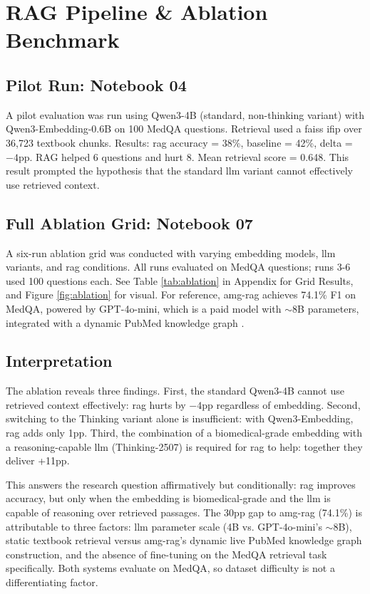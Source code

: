 \chapter{RAG Pipeline \& Ablation Benchmark}
\label{ch:ablation}

\section{Pilot Run: Notebook 04}

A pilot evaluation was run using Qwen3-4B (standard, non-thinking variant) with Qwen3-Embedding-0.6B on 100 MedQA questions. Retrieval used a \gls{faiss} \gls{ifip} \cite{johnson2019} over 36,723 textbook chunks. Results: \gls{rag} accuracy = 38\%, baseline = 42\%, delta = $-4$\gls{pp}. RAG helped 6 questions and hurt 8. Mean retrieval score = 0.648. This result prompted the hypothesis that the standard \gls{llm} variant cannot effectively use retrieved context. 

\section{Full Ablation Grid: Notebook 07}
A six-run ablation grid was conducted with varying embedding models, \gls{llm} variants, and \gls{rag} conditions. All runs evaluated on MedQA questions; runs 3-6 used 100 questions each. See Table \ref{tab:ablation} in Appendix for Grid Results, and Figure \ref{fig:ablation} for visual. For reference, \gls{amg-rag} achieves 74.1\% F1 on MedQA, powered by GPT-4o-mini, which is a paid model with $\sim$8B parameters, integrated with a dynamic PubMed knowledge graph \cite{rezaei2025}. 

\section{Interpretation}

The ablation reveals three findings. First, the standard Qwen3-4B cannot use retrieved context effectively: \gls{rag} hurts by $-4$\gls{pp} regardless of embedding. Second, switching to the Thinking variant alone is insufficient: with Qwen3-Embedding, \gls{rag} adds only 1\gls{pp}. Third, the combination of a biomedical-grade embedding with a reasoning-capable \gls{llm} (Thinking-2507) is required for \gls{rag} to help: together they deliver +11\gls{pp}.

This answers the research question affirmatively but conditionally: \gls{rag} improves accuracy, but only when the embedding is biomedical-grade and the \gls{llm} is capable of reasoning over retrieved passages. The 30\gls{pp} gap to \gls{amg-rag} (74.1\%) is attributable to three factors: \gls{llm} parameter scale (4B vs. GPT-4o-mini's $\sim$8B), static textbook retrieval versus \gls{amg-rag}'s dynamic live PubMed knowledge graph construction, and the absence of fine-tuning on the MedQA retrieval task specifically. Both systems evaluate on MedQA, so dataset difficulty is not a differentiating factor.